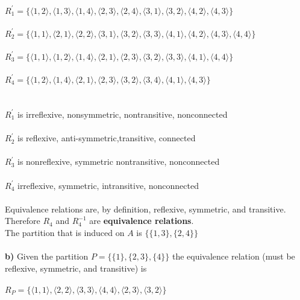 \documentclass{article}
\begin{document}
$R^{'}_{1} = \{\langle 1,2 \rangle, \langle 1,3 \rangle, \langle 1,4 \rangle, \langle 2,3 \rangle, \langle 2,4 \rangle, \langle 3,1\rangle,\langle 3,2 \rangle,\langle 4,2 \rangle,\langle 4,3 \rangle\}$ \\ \\
$R^{'}_{2} = \{\langle 1,1 \rangle, \langle 2,1 \rangle,\langle 2,2 \rangle,\langle 3,1 \rangle,\langle 3,2 \rangle, \langle 3,3 \rangle, \langle 4,1 \rangle, \langle 4,2 \rangle, \langle 4,3 \rangle, \langle 4,4\rangle\}$ \\ \\
$R^{'}_{3} = \{\langle 1,1 \rangle,\langle 1,2 \rangle,\langle 1,4 \rangle, \langle 2,1 \rangle, \langle 2,3 \rangle, \langle 3,2 \rangle, \langle 3,3 \rangle, \langle 4,1\rangle,\langle 4,4 \rangle\}$ \\ \\
$R^{'}_{4} = \{\langle 1,2 \rangle, \langle 1,4 \rangle, \langle 2,1 \rangle, \langle 2,3 \rangle, \langle 3,2 \rangle, \langle 3,4\rangle , \langle 4,1\rangle, \langle 4,3\rangle\}$ \\ \\ \\ 
$R^{'}_{1}$ is irreflexive, nonsymmetric, nontransitive, nonconnected \\ \\
$R^{'}_{2}$ is reflexive, anti-symmetric,transitive, connected \\ \\
$R^{'}_{3}$ is nonreflexive, symmetric nontransitive, nonconnected \\ \\
$R^{'}_{4}$ irreflexive, symmetric, intransitive, nonconnected \\ \\
Equivalence relations are, by definition, reflexive, symmetric, and transitive. Therefore $R_4$ and $R^{-1}_{4}$ are \textbf{equivalence relations}. \\
The partition that is induced on $A$ is $\{\{1,3\},\{2,4\}\}$  \\ \\ 
\textbf{b)} Given the partition $P = \{\{1\}, \{2,3\}, \{4\}\}$ the equivalence relation (must be reflexive, symmetric, and transitive) is \\ \\ 
$R_P = \{\langle 1,1 \rangle, \langle 2,2 \rangle, \langle 3,3 \rangle, \langle 4,4 \rangle, \langle 2,3 \rangle, \langle 3,2\rangle\} $ \\ 
\end{document}
